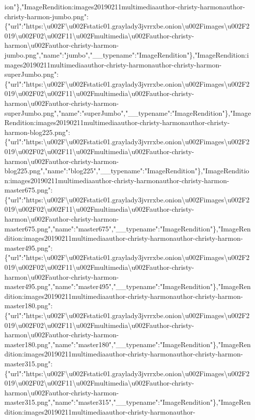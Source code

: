 ion"\},"ImageRendition:images20190211multimediaauthor-christy-harmonauthor-christy-harmon-jumbo.png":\{"url":"https:\textbackslash{}u002F\textbackslash{}u002Fstatic01.graylady3jvrrxbe.onion\textbackslash{}u002Fimages\textbackslash{}u002F2019\textbackslash{}u002F02\textbackslash{}u002F11\textbackslash{}u002Fmultimedia\textbackslash{}u002Fauthor-christy-harmon\textbackslash{}u002Fauthor-christy-harmon-jumbo.png","name":"jumbo","\_\_typename":"ImageRendition"\},"ImageRendition:images20190211multimediaauthor-christy-harmonauthor-christy-harmon-superJumbo.png":\{"url":"https:\textbackslash{}u002F\textbackslash{}u002Fstatic01.graylady3jvrrxbe.onion\textbackslash{}u002Fimages\textbackslash{}u002F2019\textbackslash{}u002F02\textbackslash{}u002F11\textbackslash{}u002Fmultimedia\textbackslash{}u002Fauthor-christy-harmon\textbackslash{}u002Fauthor-christy-harmon-superJumbo.png","name":"superJumbo","\_\_typename":"ImageRendition"\},"ImageRendition:images20190211multimediaauthor-christy-harmonauthor-christy-harmon-blog225.png":\{"url":"https:\textbackslash{}u002F\textbackslash{}u002Fstatic01.graylady3jvrrxbe.onion\textbackslash{}u002Fimages\textbackslash{}u002F2019\textbackslash{}u002F02\textbackslash{}u002F11\textbackslash{}u002Fmultimedia\textbackslash{}u002Fauthor-christy-harmon\textbackslash{}u002Fauthor-christy-harmon-blog225.png","name":"blog225","\_\_typename":"ImageRendition"\},"ImageRendition:images20190211multimediaauthor-christy-harmonauthor-christy-harmon-master675.png":\{"url":"https:\textbackslash{}u002F\textbackslash{}u002Fstatic01.graylady3jvrrxbe.onion\textbackslash{}u002Fimages\textbackslash{}u002F2019\textbackslash{}u002F02\textbackslash{}u002F11\textbackslash{}u002Fmultimedia\textbackslash{}u002Fauthor-christy-harmon\textbackslash{}u002Fauthor-christy-harmon-master675.png","name":"master675","\_\_typename":"ImageRendition"\},"ImageRendition:images20190211multimediaauthor-christy-harmonauthor-christy-harmon-master495.png":\{"url":"https:\textbackslash{}u002F\textbackslash{}u002Fstatic01.graylady3jvrrxbe.onion\textbackslash{}u002Fimages\textbackslash{}u002F2019\textbackslash{}u002F02\textbackslash{}u002F11\textbackslash{}u002Fmultimedia\textbackslash{}u002Fauthor-christy-harmon\textbackslash{}u002Fauthor-christy-harmon-master495.png","name":"master495","\_\_typename":"ImageRendition"\},"ImageRendition:images20190211multimediaauthor-christy-harmonauthor-christy-harmon-master180.png":\{"url":"https:\textbackslash{}u002F\textbackslash{}u002Fstatic01.graylady3jvrrxbe.onion\textbackslash{}u002Fimages\textbackslash{}u002F2019\textbackslash{}u002F02\textbackslash{}u002F11\textbackslash{}u002Fmultimedia\textbackslash{}u002Fauthor-christy-harmon\textbackslash{}u002Fauthor-christy-harmon-master180.png","name":"master180","\_\_typename":"ImageRendition"\},"ImageRendition:images20190211multimediaauthor-christy-harmonauthor-christy-harmon-master315.png":\{"url":"https:\textbackslash{}u002F\textbackslash{}u002Fstatic01.graylady3jvrrxbe.onion\textbackslash{}u002Fimages\textbackslash{}u002F2019\textbackslash{}u002F02\textbackslash{}u002F11\textbackslash{}u002Fmultimedia\textbackslash{}u002Fauthor-christy-harmon\textbackslash{}u002Fauthor-christy-harmon-master315.png","name":"master315","\_\_typename":"ImageRendition"\},"ImageRendition:images20190211multimediaauthor-christy-harmonauthor-